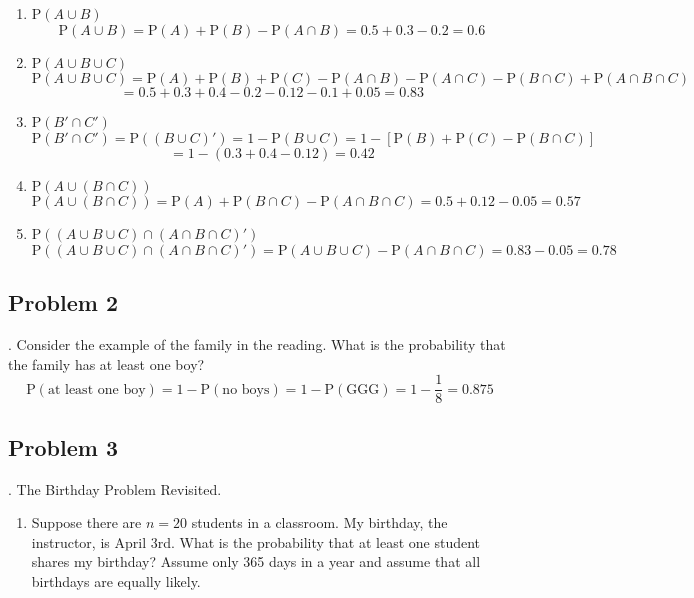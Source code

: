 \documentclass[
]{book}
\providecommand{\tightlist}{%
  \setlength{\itemsep}{0pt}\setlength{\parskip}{0pt}}
\begin{document}
\begin{enumerate}
\def\labelenumi{\alph{enumi}.}
\item
  \(\mbox{P}(A\cup B)\)
  \[
  \mbox{P}(A\cup B) = \mbox{P}(A)+\mbox{P}(B)-\mbox{P}(A\cap B)= 0.5+0.3-0.2 = 0.6
  \]
\item
  \(\mbox{P}(A\cup B \cup C)\)
  \[
  \mbox{P}(A\cup B \cup C) = \mbox{P}(A)+\mbox{P}(B)+\mbox{P}(C)-\mbox{P}(A\cap B)-\mbox{P}(A\cap C)-\mbox{P}(B\cap C)+\mbox{P}(A\cap B \cap C)
  \]
  \[
  = 0.5+0.3+0.4-0.2-0.12-0.1+0.05 = 0.83
  \]
\item
  \(\mbox{P}(B'\cap C')\)
  \[
  \mbox{P}(B'\cap C')=\mbox{P}((B\cup C)') = 1-\mbox{P}(B\cup C) = 1-[\mbox{P}(B)+\mbox{P}(C)-\mbox{P}(B\cap C)]
  \]
  \[
  = 1-(0.3+0.4-0.12) = 0.42
  \]
\item
  \(\mbox{P}(A\cup (B\cap C))\)
  \[
  \mbox{P}(A\cup (B\cap C)) = \mbox{P}(A)+\mbox{P}(B\cap C) -\mbox{P}(A\cap B \cap C) = 0.5+0.12-0.05 = 0.57
  \]
\item
  \(\mbox{P}((A\cup B \cup C)\cap (A\cap B \cap C)')\)
  \[
  \mbox{P}((A\cup B \cup C)\cap (A\cap B \cap C)')=\mbox{P}(A\cup B \cup C)-\mbox{P}(A\cap B \cap C) = 0.83-0.05 = 0.78
  \]
\end{enumerate}

\hypertarget{problem-2-7}{%
\subsection{Problem 2}\label{problem-2-7}}

. Consider the example of the family in the reading. What is the probability that the family has at least one boy?\\
\[
\mbox{P}(\mbox{at least one boy})=1-\mbox{P}(\mbox{no boys})=1-\mbox{P}(\mbox{GGG})=1-\frac{1}{8} = 0.875
\]

\hypertarget{problem-3-4}{%
\subsection{Problem 3}\label{problem-3-4}}

. The Birthday Problem Revisited.

\begin{enumerate}
\def\labelenumi{\alph{enumi}.}
\tightlist
\item
  Suppose there are \(n=20\) students in a classroom. My birthday, the instructor, is April 3rd. What is the probability that at least one student shares my birthday? Assume only 365 days in a year and assume that all birthdays are equally likely.
\end{enumerate}
\end{document}

